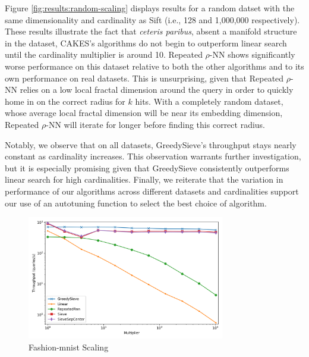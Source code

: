 Figure \ref{fig:results:random-scaling} displays results for a random datset with the same dimensionality and cardinality as Sift (i.e., 128 and 1,000,000 respectively). 
These results illustrate the fact that \emph{ceteris paribus}, absent a manifold structure in the dataset, CAKES's algorithms do not begin to outperform linear search until the cardinality multiplier is around 10. 
Repeated $\rho$-NN shows significantly worse performance on this dataset relative to both the other algorithms and to its own performance on real datasets. 
This is unsurprising, given that Repeated $\rho$-NN relies on a low local fractal dimension around the query in order to quickly home in on the correct radius for $k$ hits. 
With a completely random dataset, whose average local fractal dimension will be near its embedding dimension, Repeated $\rho$-NN will iterate for longer before finding this correct radius. 

Notably, we observe that on all datasets, GreedySieve's throughput stays nearly constant as cardinality increases. This observation warrants further investigation, but it is especially promising given that GreedySieve consistently outperforms linear search for high cardinalities. 
Finally, we reiterate that the variation in performance of our algorithms across different datasets and cardinalities support our use of an autotuning function to select the best choice of algorithm. 


\begin{figure}[ht!]
    \centering
    \includegraphics[width=3.4in]{images/result_plots/fashion-mnist_10_scaling.png}
    \caption{
        Fashion-mnist Scaling
    }
    \label{fig:results:fashion-mnist-scaling}
\end{figure}

